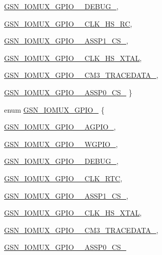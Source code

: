 \begin{DoxyCompactItemize}
\hyperlink{a00519_a46836e1fee802d5f2be675a93327d2f0a317bf7cad578841760145e2fab3754a1}{GSN\_\-IOMUX\_\-GPIO\_\_\-DEBUG\_}, 
\par
\hyperlink{a00519_a46836e1fee802d5f2be675a93327d2f0aa14d7c57e033844948858142a5b7aced}{GSN\_\-IOMUX\_\-GPIO\_\_\-CLK\_\-HS\_\-RC}, 
\par
\hyperlink{a00519_a46836e1fee802d5f2be675a93327d2f0a8a6c0f490e88e3dfeb1464a6aebfe30f}{GSN\_\-IOMUX\_\-GPIO\_\_\-ASSP1\_\-CS\_}, 
\par
\hyperlink{a00519_a46836e1fee802d5f2be675a93327d2f0a382333e81904a5f29514ab3cbd9307db}{GSN\_\-IOMUX\_\-GPIO\_\_\-CLK\_\-HS\_\-XTAL}, 
\par
\hyperlink{a00519_a46836e1fee802d5f2be675a93327d2f0a52a27ecfe405f76f75ae86faaaad3bf3}{GSN\_\-IOMUX\_\-GPIO\_\_\-CM3\_\-TRACEDATA\_}, 
\par
\hyperlink{a00519_a46836e1fee802d5f2be675a93327d2f0a11bf2f987d71273c828aa68f7498fc0a}{GSN\_\-IOMUX\_\-GPIO\_\_\-ASSP0\_\-CS\_}
 \}
\item 
enum \hyperlink{a00519_a298d52f4e286236c7429f0bd7044a6f0}{GSN\_\-IOMUX\_\-GPIO\_} \{ \par
\hyperlink{a00519_a298d52f4e286236c7429f0bd7044a6f0a012fbe78b4bedb78b2b6ba5bf8463f2c}{GSN\_\-IOMUX\_\-GPIO\_\_\-AGPIO\_}, 
\par
\hyperlink{a00519_a298d52f4e286236c7429f0bd7044a6f0a183199175ea34acc59e94e903f59bbce}{GSN\_\-IOMUX\_\-GPIO\_\_\-WGPIO\_}, 
\par
\hyperlink{a00519_a298d52f4e286236c7429f0bd7044a6f0a77001e4b55d7433853b2f63a88741720}{GSN\_\-IOMUX\_\-GPIO\_\_\-DEBUG\_}, 
\par
\hyperlink{a00519_a298d52f4e286236c7429f0bd7044a6f0a78fefd695f8093333aefa4f796cc3a27}{GSN\_\-IOMUX\_\-GPIO\_\_\-CLK\_\-RTC}, 
\par
\hyperlink{a00519_a298d52f4e286236c7429f0bd7044a6f0a805bf6b90196f30cacd777526a81298d}{GSN\_\-IOMUX\_\-GPIO\_\_\-ASSP1\_\-CS\_}, 
\par
\hyperlink{a00519_a298d52f4e286236c7429f0bd7044a6f0a6f3c0f5c28a33f0bf497a132643c4895}{GSN\_\-IOMUX\_\-GPIO\_\_\-CLK\_\-HS\_\-XTAL}, 
\par
\hyperlink{a00519_a298d52f4e286236c7429f0bd7044a6f0ae12adeb0197527dd889191d3fb3ef079}{GSN\_\-IOMUX\_\-GPIO\_\_\-CM3\_\-TRACEDATA\_}, 
\par
\hyperlink{a00519_a298d52f4e286236c7429f0bd7044a6f0a010a97c43ebb74ba10603d797ba2cbbf}{GSN\_\-IOMUX\_\-GPIO\_\_\-ASSP0\_\-CS\_}

\end{DoxyCompactItemize}

